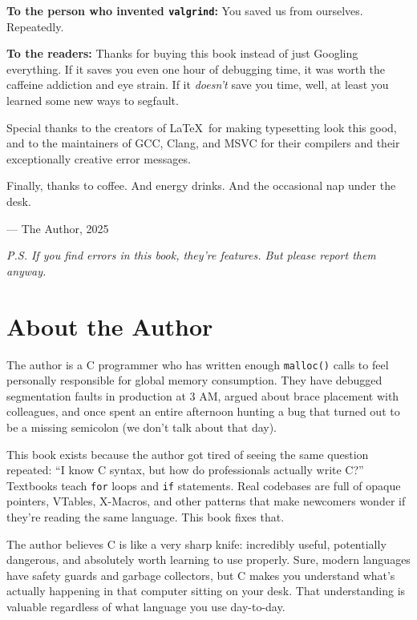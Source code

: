 \documentclass[11pt,openany]{book}
\begin{document}
\textbf{To the person who invented \texttt{valgrind}:} You saved us from ourselves. Repeatedly.

\textbf{To the readers:} Thanks for buying this book instead of just Googling everything. If it saves you even one hour of debugging time, it was worth the caffeine addiction and eye strain. If it \textit{doesn't} save you time, well, at least you learned some new ways to segfault.

\vspace{1em}

Special thanks to the creators of \LaTeX\ for making typesetting look this good, and to the maintainers of GCC, Clang, and MSVC for their compilers and their exceptionally creative error messages.

Finally, thanks to coffee. And energy drinks. And the occasional nap under the desk.

\vspace{2em}

— The Author, 2025

\textit{P.S. If you find errors in this book, they're features. But please report them anyway.}

\clearpage

\chapter*{About the Author}

The author is a C programmer who has written enough \texttt{malloc()} calls to feel personally responsible for global memory consumption. They have debugged segmentation faults in production at 3 AM, argued about brace placement with colleagues, and once spent an entire afternoon hunting a bug that turned out to be a missing semicolon (we don't talk about that day).

This book exists because the author got tired of seeing the same question repeated: ``I know C syntax, but how do professionals actually write C?'' Textbooks teach \texttt{for} loops and \texttt{if} statements. Real codebases are full of opaque pointers, VTables, X-Macros, and other patterns that make newcomers wonder if they're reading the same language. This book fixes that.

The author believes C is like a very sharp knife: incredibly useful, potentially dangerous, and absolutely worth learning to use properly. Sure, modern languages have safety guards and garbage collectors, but C makes you understand what's actually happening in that computer sitting on your desk. That understanding is valuable regardless of what language you use day-to-day.
\end{document}
